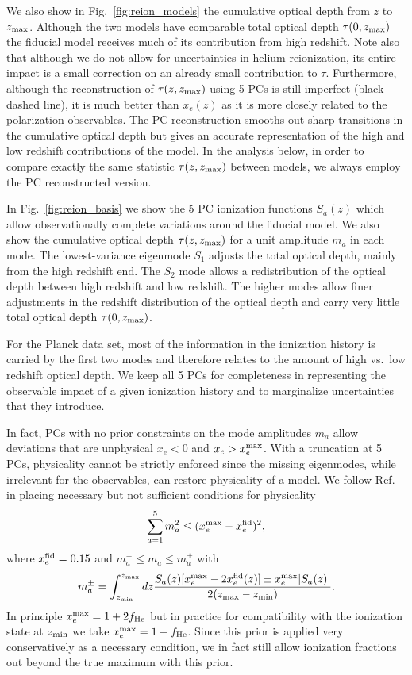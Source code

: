\documentclass[prd,twocolumn,amsmath,amssymb,floatfix,superscriptaddress,nofootinbib]{revtex4-1}
\begin{document}
 We also show in Fig.~\ref{fig:reion_models} the cumulative optical depth from $z$ to $z_{\rm max}$.    Although the
two models have comparable total optical depth $\tau(0,z_{\rm max})$ the fiducial model 
receives much of its contribution from high redshift.   Note also that although we do not 
allow for uncertainties in helium reionization, its entire impact is a small correction on an already small contribution to $\tau$.  Furthermore, although the reconstruction of $\tau(z,z_{\rm max})$ using 5 PCs 
is still imperfect (black dashed line), it is much better than $x_e(z)$ as it is more closely related to the polarization
observables.    The PC reconstruction smooths out sharp transitions in the cumulative
optical depth but gives an accurate representation of the high and low redshift contributions
of the model.   In the analysis below, in order to compare exactly the same statistic $\tau(z,z_{\rm max})$ between models, we always employ the PC reconstructed version.


In Fig.~\ref{fig:reion_basis} we show the 5 PC ionization functions $S_a(z)$ which allow
observationally complete variations around the fiducial model.   We also show  the cumulative
optical depth $\tau(z,z_{\rm max})$ for a unit amplitude $m_a$ in each mode.
The lowest-variance eigenmode $S_1$ adjusts the total optical depth, mainly from the
high redshift end.   The $S_2$ mode allows a redistribution of the optical depth between
high redshift and low redshift.   The higher modes allow finer adjustments in the redshift
distribution of the optical depth and carry very little total optical depth $\tau(0,z_{\rm max})$.

For the Planck data set, most of the information in the ionization history is carried by the
first two modes and therefore relates to the amount of high vs.~low redshift optical depth.   
We keep all 5 PCs  for completeness in representing the observable
impact of a given ionization history and to marginalize uncertainties that they introduce.

In fact, PCs with no prior constraints on the mode amplitudes $m_a$
allow deviations that are unphysical $x_e<0$ and $x_e >x_e^{\rm max}$.  With a truncation at 
5 PCs, physicality cannot be strictly enforced since the missing eigenmodes, while irrelevant
for the observables, can restore physicality of a model.   We follow Ref.~\cite{Mortonson:2008rx} in placing necessary but not sufficient conditions for physicality  
\begin{equation}
\sum_{a=1}^5 m_a^2 \le (x_e^{\rm max}-x_e^{\rm fid})^2,
\end{equation}
where $x_e^{\rm fid}=0.15$ and $m_a^{-} \le m_a \le m_a^{+}$ with
\begin{equation}
m_a^{\pm} = \int_{z_{\rm min}}^{z_{\rm max} } dz \frac{S_a(z)[x_e^{\rm max} -2 x_e^{\rm fid}(z)]
\pm x_e^{\rm max} | S_a(z)|}{2(z_{\rm max}-z_{\rm min})}.
\label{eq:individualprior}
\end{equation}
In principle $x_e^{\rm max}=1+ 2 f_{\rm He}$ but in practice for compatibility with the ionization state  at $z_{\rm min}$ we
take $x_e^{\rm max} =1+f_{\rm He}$.   Since this prior is applied very conservatively as a necessary condition, we in fact still allow
ionization fractions out beyond the true maximum with this prior.
\end{document}
